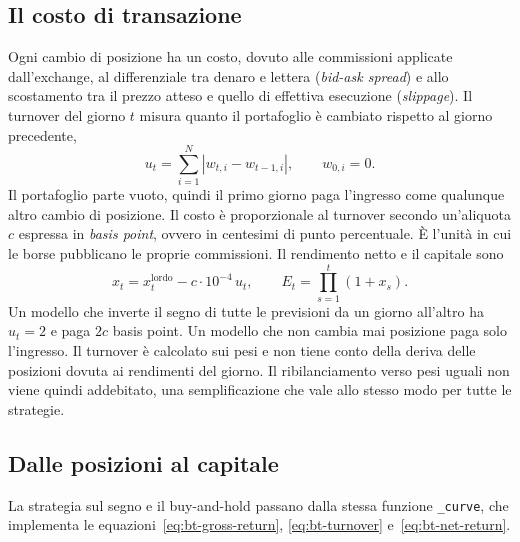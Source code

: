 \subsection{Il costo di transazione}
\label{sec:bt-cost}

Ogni cambio di posizione ha un costo, dovuto alle commissioni applicate dall'exchange, al differenziale tra denaro e lettera (\emph{bid-ask spread}) e allo scostamento tra il prezzo atteso e quello di effettiva esecuzione (\emph{slippage}). Il turnover del giorno $t$ misura quanto il portafoglio è cambiato rispetto al giorno precedente,
\begin{equation}
\label{eq:bt-turnover}
u_t=\sum_{i=1}^N\left|w_{t,i}-w_{t-1,i}\right|,\qquad w_{0,i}=0.
\end{equation}
Il portafoglio parte vuoto, quindi il primo giorno paga l'ingresso come qualunque altro cambio di posizione. Il costo è proporzionale al turnover secondo un'aliquota $c$ espressa in \emph{basis point}, ovvero in centesimi di punto percentuale. È l'unità in cui le borse pubblicano le proprie commissioni. Il rendimento netto e il capitale sono
\begin{equation}
\label{eq:bt-net-return}
x_t=x_t^{\mathrm{lordo}}-c\cdot10^{-4}\,u_t,\qquad E_t=\prod_{s=1}^t(1+x_s).
\end{equation}
Un modello che inverte il segno di tutte le previsioni da un giorno all'altro ha $u_t=2$ e paga $2c$ basis point. Un modello che non cambia mai posizione paga solo l'ingresso. Il turnover è calcolato sui pesi e non tiene conto della deriva delle posizioni dovuta ai rendimenti del giorno. Il ribilanciamento verso pesi uguali non viene quindi addebitato, una semplificazione che vale allo stesso modo per tutte le strategie.

\subsection{Dalle posizioni al capitale}
\label{sec:bt-curve}

La strategia sul segno e il buy-and-hold passano dalla stessa funzione \texttt{\_curve}, che implementa le equazioni~\eqref{eq:bt-gross-return}, \eqref{eq:bt-turnover} e~\eqref{eq:bt-net-return}.


